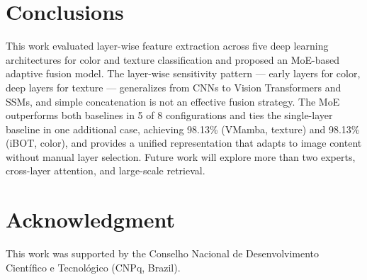 \documentclass[conference]{IEEEtran}
\begin{document}
\section{Conclusions}

This work evaluated layer-wise feature extraction across five deep
learning architectures for color and texture classification and proposed
an MoE-based adaptive fusion model.
The layer-wise sensitivity pattern — early layers for color, deep layers
for texture — generalizes from CNNs to Vision Transformers and SSMs, and
simple concatenation is not an effective fusion strategy.
The MoE outperforms both baselines in 5 of 8 configurations and ties
the single-layer baseline in one additional case, achieving 98.13\%
(VMamba, texture) and 98.13\% (iBOT, color), and provides a unified
representation that adapts to image content without manual layer
selection.
Future work will explore more than two experts, cross-layer attention, and
large-scale retrieval.

\section*{Acknowledgment}

This work was supported by the Conselho Nacional de Desenvolvimento
Cient\'{i}fico e Tecnol\'{o}gico (CNPq, Brazil).
\end{document}

